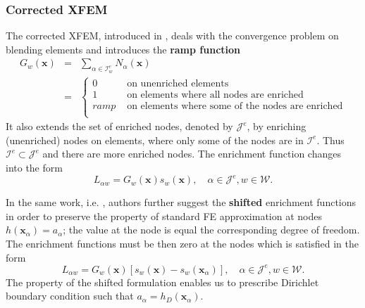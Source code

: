\documentclass[preprint,12pt]{elsarticle}
\def\vc#1{\mathbf{\boldsymbol{#1}}}     %
\newcommand{\bx}{\vc{x}}
\begin{document}
\subsubsection{Corrected XFEM}
The corrected XFEM, introduced in  \cite{cxfem}, deals with the convergence problem on blending elements and 
introduces the \textbf{ramp function}
\begin{eqnarray} \label{eqn:ramp_function}
  G_w(\bx) &=& \sum \limits_{\alpha\in\mathcal{I}_w^e} N_\alpha(\bx)    \\
  &=& 
  \begin{cases}
    0 & \textrm{ on unenriched elements}    \\
    1 & \textrm{ on elements where all nodes are enriched}    \\
    ramp & \textrm{ on elements where some of the nodes are enriched}    \\
  \end{cases} \nonumber
\end{eqnarray}
It also extends the set of enriched nodes, denoted by $\mathcal{J}^e$, by enriching (unenriched) nodes 
on elements, where only some of the nodes are in $\mathcal{I}^e$. Thus $\mathcal{I}^e\subset\mathcal{J}^e$ 
and there are more enriched nodes.
The enrichment function changes into the form
\begin{equation} \label{eqn:xfem_ramp}
    L_{\alpha w} = G_w(\bx) s_{w}(\bx), \quad \alpha\in\mathcal{J}^e, w\in\mathcal{W}.
\end{equation}


In the same work, i.e. \cite{cxfem}, authors further suggest the \textbf{shifted} enrichment functions in order 
to preserve the property of standard 
FE approximation at nodes $h(\bx_\alpha)=a_\alpha$; the value at the node is equal the corresponding degree
of freedom. The enrichment functions must be then zero at the nodes which is satisfied in the form
\begin{equation} \label{eqn:xfem_shift}
    L_{\alpha w} = G_w(\bx) \left[s_w(\bx) - s_w(\bx_\alpha)\right],
    \quad \alpha\in\mathcal{J}^e, w\in\mathcal{W}.
\end{equation} 
The property of the shifted formulation enables us to prescribe Dirichlet boundary condition such that
$a_\alpha = h_D(\bx_\alpha)$.
\end{document}
